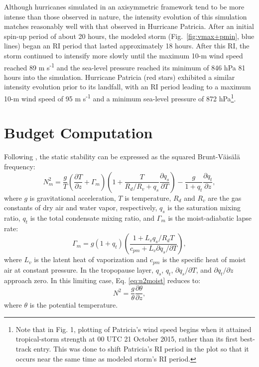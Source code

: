 \documentclass{ametsoc}
\begin{document}
Although hurricanes simulated in an axisymmetric framework tend to be more intense than those observed in nature, the intensity evolution of this simulation matches reasonably well with that observed in Hurricane Patricia.
After an initial spin-up period of about 20 hours, the modeled storm (Fig.~\ref{fig:vmax+pmin}, blue lines) began an RI period that lasted approximately 18 hours.
After this RI, the storm continued to intensify more slowly until the maximum 10-m wind speed reached 89 m s\textsuperscript{-1} and the sea-level pressure reached its minimum of 846 hPa 81 hours into the simulation.
Hurricane Patricia (red stars) exhibited a similar intensity evolution prior to its landfall, with an RI period leading to a maximum 10-m wind speed of 95 m s\textsuperscript{-1} and a minimum sea-level pressure of 872 hPa\footnote{Note that in Fig. 1, plotting of Patricia's wind speed begins when it attained tropical-storm strength at 00 UTC 21 October 2015, rather than its first best-track entry. This was done to shift Patricia's RI period in the plot so that it occurs near the same time as modeled storm's RI period.}.

 \section{Budget Computation}

Following \cite{Bryan2017}, the static stability can be expressed as the squared Brunt-V{\"a}is{\"a}l{\"a} frequency:
   \begin{equation} \label{eq:n2moist}
   N_m^2 = \frac{g}{T}\left(\frac{\partial T}{\partial z}+\Gamma_m\right)\left(1+\frac{T}{R_d/R_v+q_s}\frac{\partial q_s}{\partial T}\right)-\frac{g}{1+q_t}\frac{\partial q_t}{\partial z},
   \end{equation}
where $g$ is gravitational acceleration, $T$ is temperature, $R_d$ and $R_v$ are the gas constants of dry air and water vapor, respectively, $q_s$ is the saturation mixing ratio, $q_t$ is the total condensate mixing ratio, and $\Gamma_m$ is the moist-adiabatic lapse rate:
   \begin{equation} \label{eq:gamma_m}
      \Gamma_m = g(1+q_t)\left(\frac{1+L_vq_s/R_dT}{c_{pm}+L_v\partial q_s/\partial T}\right),
   \end {equation}
where $L_v$ is the latent heat of vaporization and $c_{pm}$ is the specific heat of moist air at constant pressure.
In the tropopause layer, $q_s$, $q_t$, ${\partial q_s}/{\partial T}$, and ${\partial q_t}/{\partial z}$ approach zero. In this limiting case, Eq. \ref{eq:n2moist} reduces to:
   \begin{equation} \label{eq:n2dry}
   N^2 = \frac{g}{\theta}\frac{\partial \theta}{\partial z},
   \end{equation}
where $\theta$ is the potential temperature.
\end{document}
